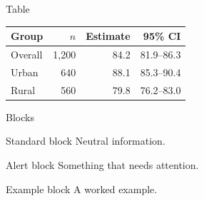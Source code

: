 \documentclass[aspectratio=169, 11pt]{beamer}
\begin{document}
\begin{frame}{Table}
  \centering
  \begin{tabular}{lrrr}
    \toprule
    Group & $n$ & Estimate & 95\% CI \\
    \midrule
    Overall & 1,200 & 84.2 & 81.9--86.3 \\
    Urban   &   640 & 88.1 & 85.3--90.4 \\
    Rural   &   560 & 79.8 & 76.2--83.0 \\
    \bottomrule
  \end{tabular}
\end{frame}

\begin{frame}{Blocks}
  \begin{block}{Standard block}
    Neutral information.
  \end{block}
  \begin{alertblock}{Alert block}
    Something that needs attention.
  \end{alertblock}
  \begin{exampleblock}{Example block}
    A worked example.
  \end{exampleblock}
\end{frame}

\neudatacopyrightframe
\end{document}
